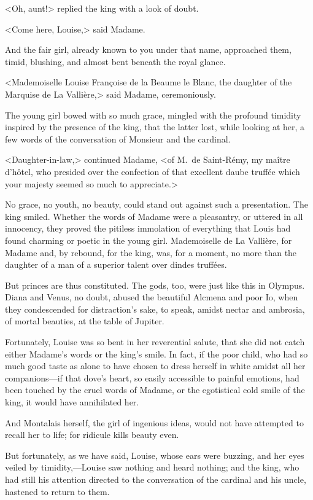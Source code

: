 <Oh, aunt!> replied the king with a look of doubt.

<Come here, Louise,> said Madame.

And the fair girl, already known to you under that name, approached them, timid, blushing, and almost bent beneath the royal glance.

<Mademoiselle Louise Françoise de la Beaume le Blanc, the daughter of the Marquise de La Vallière,> said Madame, ceremoniously.

The young girl bowed with so much grace, mingled with the profound timidity inspired by the presence of the king, that the latter lost, while looking at her, a few words of the conversation of Monsieur and the cardinal.

<Daughter-in-law,> continued Madame, <of M.~de Saint-Rémy, my maître d'hôtel, who presided over the confection of that excellent daube truffée which your majesty seemed so much to appreciate.>

No grace, no youth, no beauty, could stand out against such a presentation. The king smiled. Whether the words of Madame were a pleasantry, or uttered in all innocency, they proved the pitiless immolation of everything that Louis had found charming or poetic in the young girl. Mademoiselle de La Vallière, for Madame and, by rebound, for the king, was, for a moment, no more than the daughter of a man of a superior talent over dindes truffées.

But princes are thus constituted. The gods, too, were just like this in Olympus. Diana and Venus, no doubt, abused the beautiful Alcmena and poor Io, when they condescended for distraction's sake, to speak, amidst nectar and ambrosia, of mortal beauties, at the table of Jupiter.

Fortunately, Louise was so bent in her reverential salute, that she did not catch either Madame's words or the king's smile. In fact, if the poor child, who had so much good taste as alone to have chosen to dress herself in white amidst all her companions—if that dove's heart, so easily accessible to painful emotions, had been touched by the cruel words of Madame, or the egotistical cold smile of the king, it would have annihilated her.

And Montalais herself, the girl of ingenious ideas, would not have attempted to recall her to life; for ridicule kills beauty even.

But fortunately, as we have said, Louise, whose ears were buzzing, and her eyes veiled by timidity,—Louise saw nothing and heard nothing; and the king, who had still his attention directed to the conversation of the cardinal and his uncle, hastened to return to them.

